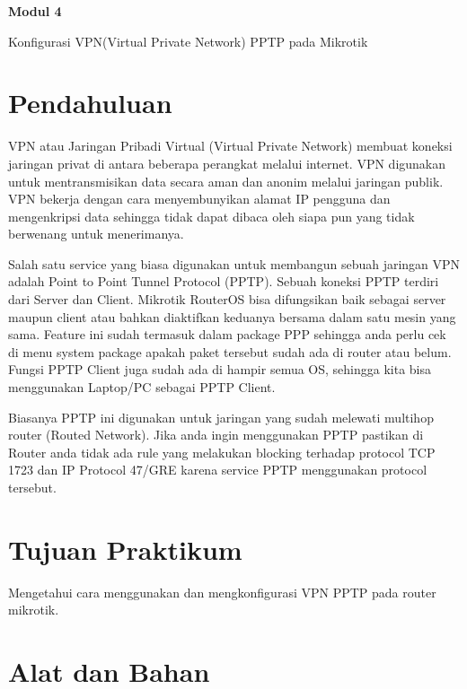 \newpage
\setcounter{section}{0}
\renewcommand{\thesection}{\arabic{section}}

\begin{center}
    \Huge
    \textbf{Modul 4}
    
    Konfigurasi VPN(Virtual Private Network) PPTP pada Mikrotik

\end{center}


\section{Pendahuluan}

VPN atau Jaringan Pribadi Virtual (Virtual Private Network) membuat koneksi jaringan privat di
antara beberapa perangkat melalui internet. VPN digunakan untuk mentransmisikan data secara aman
dan anonim melalui jaringan publik. VPN bekerja dengan cara menyembunyikan alamat IP pengguna
dan mengenkripsi data sehingga tidak dapat dibaca oleh siapa pun yang tidak berwenang untuk
menerimanya.

Salah satu service yang biasa digunakan untuk membangun sebuah jaringan VPN adalah Point to
Point Tunnel Protocol (PPTP). Sebuah koneksi PPTP terdiri dari Server dan Client.
Mikrotik RouterOS bisa difungsikan baik sebagai server maupun client atau bahkan diaktifkan
keduanya bersama dalam satu mesin yang sama. Feature ini sudah termasuk dalam package PPP
sehingga anda perlu cek di menu system package apakah paket tersebut sudah ada di router atau
belum. Fungsi PPTP Client juga sudah ada di hampir semua OS, sehingga kita bisa menggunakan
Laptop/PC sebagai PPTP Client.

Biasanya PPTP ini digunakan untuk jaringan yang sudah melewati multihop router (Routed Network).
Jika anda ingin menggunakan PPTP pastikan di Router anda tidak ada rule yang melakukan blocking
terhadap protocol TCP 1723 dan IP Protocol 47/GRE karena service PPTP menggunakan protocol
tersebut.

\section{Tujuan Praktikum}

Mengetahui cara menggunakan dan mengkonfigurasi VPN PPTP pada router mikrotik.

\section{Alat dan Bahan}

